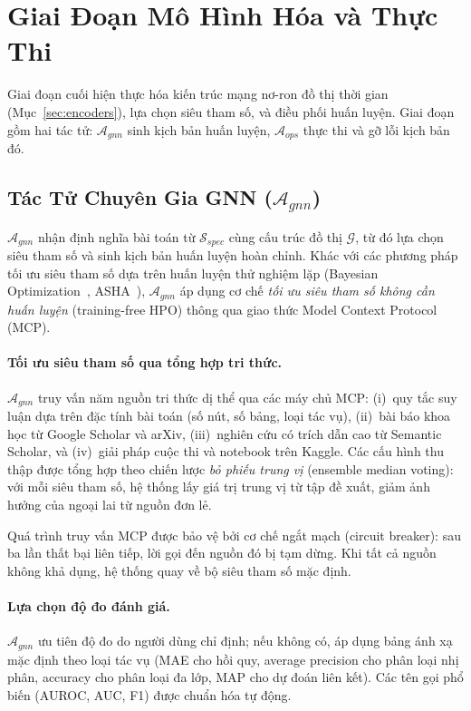 \section{Giai Đoạn Mô Hình Hóa và Thực Thi}

Giai đoạn cuối hiện thực hóa kiến trúc mạng nơ-ron đồ thị thời gian (Mục~\ref{sec:encoders}), lựa chọn siêu tham số, và điều phối huấn luyện. Giai đoạn gồm hai tác tử: $\mathcal{A}_{gnn}$ sinh kịch bản huấn luyện, $\mathcal{A}_{ops}$ thực thi và gỡ lỗi kịch bản đó.

\subsection{Tác Tử Chuyên Gia GNN ($\mathcal{A}_{gnn}$)}

$\mathcal{A}_{gnn}$ nhận định nghĩa bài toán từ $\mathcal{S}_{spec}$ cùng cấu trúc đồ thị $\mathcal{G}$, từ đó lựa chọn siêu tham số và sinh kịch bản huấn luyện hoàn chỉnh. Khác với các phương pháp tối ưu siêu tham số dựa trên huấn luyện thử nghiệm lặp (Bayesian Optimization~\cite{feurer2015autosklearn}, ASHA~\cite{liaw2018tune}), $\mathcal{A}_{gnn}$ áp dụng cơ chế \textit{tối ưu siêu tham số không cần huấn luyện} (training-free HPO) thông qua giao thức Model Context Protocol (MCP).

\paragraph{Tối ưu siêu tham số qua tổng hợp tri thức.}
$\mathcal{A}_{gnn}$ truy vấn năm nguồn tri thức dị thể qua các máy chủ MCP: (i)~quy tắc suy luận dựa trên đặc tính bài toán (số nút, số bảng, loại tác vụ), (ii)~bài báo khoa học từ Google Scholar và arXiv, (iii)~nghiên cứu có trích dẫn cao từ Semantic Scholar, và (iv)~giải pháp cuộc thi và notebook trên Kaggle. Các cấu hình thu thập được tổng hợp theo chiến lược \textit{bỏ phiếu trung vị} (ensemble median voting): với mỗi siêu tham số, hệ thống lấy giá trị trung vị từ tập đề xuất, giảm ảnh hưởng của ngoại lai từ nguồn đơn lẻ.

Quá trình truy vấn MCP được bảo vệ bởi cơ chế ngắt mạch (circuit breaker): sau ba lần thất bại liên tiếp, lời gọi đến nguồn đó bị tạm dừng. Khi tất cả nguồn không khả dụng, hệ thống quay về bộ siêu tham số mặc định.

\paragraph{Lựa chọn độ đo đánh giá.}
$\mathcal{A}_{gnn}$ ưu tiên độ đo do người dùng chỉ định; nếu không có, áp dụng bảng ánh xạ mặc định theo loại tác vụ (MAE cho hồi quy, average precision cho phân loại nhị phân, accuracy cho phân loại đa lớp, MAP cho dự đoán liên kết). Các tên gọi phổ biến (AUROC, AUC, F1) được chuẩn hóa tự động.

